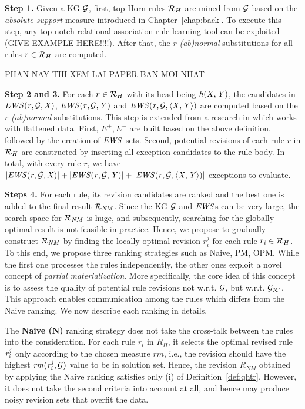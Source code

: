 \noindent \textbf{Step 1.} Given a KG $\mathcal{G}$, first, top Horn rules $\mathcal{R}_H$ are mined from $\mathcal{G}$ based on the \textit{absolute support} measure introduced in Chapter~\ref{chap:back}. To execute this step, any top notch relational association rule learning tool can be exploited (GIVE EXAMPLE HERE!!!!). After that, the $r$-\emph{(ab)normal} substitutions for all rules $r\in \mathcal{R}_H$ are computed.
\smallskip


PHAN NAY THI XEM LAI PAPER BAN MOI NHAT

\noindent \textbf{Step 2 and 3.} For each $r\in \mathcal{R}_H$ with its head being $\mathit{h(X,Y)}$, the candidates in $\mathit{EWS(r,\mathcal{G},X)}$, $\mathit{EWS(r,\mathcal{G},Y)}$ and $\mathit{EWS(r,\mathcal{G},\langle X,Y\rangle)}$ are computed based on the $r$-\emph{(ab)normal} substitutions. This step is extended from a research in \cite{iswc2016} which works with flattened data. First, $E^+, E^-$ are built based on the above definition, followed by the creation of $\mathit{EWS}$ sets. Second, potential revisions of each rule $r$ in $\mathcal{R}_H$ are constructed by inserting all exception candidates to the rule body. In total, with every rule $r$, we have $|\mathit{EWS(r,\mathcal{G},X)}|+|\mathit{EWS(r,\mathcal{G},Y)}|+|\mathit{EWS(r,\mathcal{G},\langle X,Y\rangle)}|$ exceptions to evaluate.

\smallskip

\noindent \textbf{Steps 4.} For each rule, its revision candidates are ranked and the best one is added to the final result $\mathcal{R}_{\mathit{NM}}$. Since the KG $\mathcal{G}$ and $\mathit{EWS}$s can be very large, the search space for $\mathcal{R}_{\mathit{NM}}$ is huge, and subsequently, searching for the globally optimal result is not feasible in practice. Hence, we propose to gradually construct $\mathcal{R}_{\mathit{NM}}$ by finding the locally optimal revision $r_i^{j}$ for each rule $r_i \in \mathcal{R}_{H}$. To this end, we propose three ranking strategies such as Naive, PM, OPM. While the first one processes the rules independently, the other ones exploit a novel concept of \emph{partial materialization}. More specifically, the core idea of this concept is to assess the quality of potential rule revisions not w.r.t. $\mathcal{G}$, but w.r.t. $\mathcal{G}_{\mathcal{R}'}$. This approach enables communication among the rules which differs from the Naive ranking. We now describe each ranking in details.

The \textbf{Naive (N)} ranking strategy does not take the cross-talk between the rules into the consideration. For each rule $r_i$ in $R_H$, it selects the optimal revised rule $\mathit{r^j_i}$ only according to the chosen measure $rm$, i.e., the revision should have the highest $\mathit{rm(r^j_{i},\mathcal{G})}$ value to be in solution set. Hence, the revision $R_{NM}$ obtained by applying the Naive ranking satisfies only (i) of Definition~\ref{def:qhtr}. However, it does not take the second criteria into account at all, and hence may produce noisy revision sets that overfit the data.

